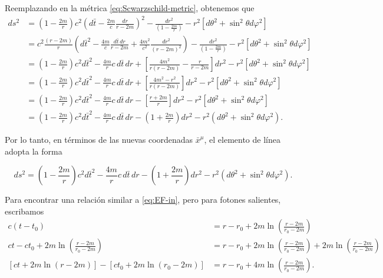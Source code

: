 \documentclass[letterpaper,11pt]{article}
\begin{document}
Reemplazando en la métrica \eqref{eq:Scwarzschild-metric}, obtenemos que
\begingroup
\allowdisplaybreaks
\begin{align}
ds^2 &= \left( 1 - \frac{2m}{r}\right) c^2 \left(d\bar{t} - \frac{2m}{c} \frac{dr}{r - 2m} \right)^2 - \frac{dr^2}{\left( 1- \frac{2m}{r} \right)} - r^2 \left[ d\theta^2 + \sin^2 \theta d\varphi^2 \right] \nonumber \\
&= c^2 \frac{(r - 2m)}{r}  \left(d\bar{t}^2 - \frac{4m}{c} \frac{d\bar{t} \, dr}{r - 2m} + \frac{4m^2}{c^2} \frac{dr^2}{(r-2m)^2} \right) - \frac{dr^2}{\left( 1- \frac{2m}{r} \right)} - r^2 \left[ d\theta^2 + \sin^2 \theta d\varphi^2 \right] \nonumber \\
&= \left(1 - \frac{2m}{r}\right) c^2d\bar{t}^2 - \frac{4m}{r} c \, d\bar{t} \, dr + \left[\frac{4m^2}{r(r-2m)} - \frac{r}{r-2m} \right] dr^2 - r^2 \left[ d\theta^2 + \sin^2 \theta d\varphi^2 \right]\nonumber  \\
&= \left(1 - \frac{2m}{r}\right) c^2d\bar{t}^2 - \frac{4m}{r} c \, d\bar{t} \, dr + \left[\frac{4m^2 - r^2}{r(r-2m)}\right] dr^2 - r^2 \left[ d\theta^2 + \sin^2 \theta d\varphi^2 \right]\nonumber  \\
&= \left(1 - \frac{2m}{r}\right) c^2d\bar{t}^2 - \frac{4m}{r} c \, d\bar{t} \, dr - \left[\frac{r + 2m}{r}\right] dr^2 - r^2 \left[ d\theta^2 + \sin^2 \theta d\varphi^2 \right] \nonumber  \\
&= \left(1 - \frac{2m}{r}\right) c^2d\bar{t}^2 - \frac{4m}{r} c \, d\bar{t} \, dr - \left(1 + \frac{2m}{r}\right) dr^2 - r^2 \left(d\theta^2 + \sin^2\theta d\varphi^2\right).
\end{align}
\endgroup

Por lo tanto, en términos de las nuevas coordenadas $\bar{x}^{\mu}$, el elemento de línea adopta la forma
\begin{shaded}
\begin{equation}
ds^2 = \left(1 - \frac{2m}{r}\right) c^2d\bar{t}^2 - \frac{4m}{r} c \, d\bar{t} \, dr - \left(1 + \frac{2m}{r}\right) dr^2 - r^2 \left(d\theta^2 + \sin^2\theta d\varphi^2\right).
\end{equation}
\end{shaded}

Para encontrar una relación similar a \eqref{eq:EF-in}, pero para fotones salientes, escribamos 
\begin{align}
c(t- t_0) &= r - r_0 + 2m\ln\left(\frac{r - 2m}{r_0 - 2m}\right) \\
ct - ct_0 + 2m\ln\left(\frac{r - 2m}{r_0 - 2m}\right) &= r - r_0 + 2m\ln\left(\frac{r - 2m}{r_0 - 2m}\right) + 2m\ln\left(\frac{r - 2m}{r_0 - 2m}\right) \\
\left[ ct + 2m\ln(r-2m)\right] - \left[ct_0 + 2m \ln(r_0 - 2m)\right] &= r - r_0  + 4m\ln\left(\frac{r - 2m}{r_0 - 2m}\right).
\end{align}
\end{document}
